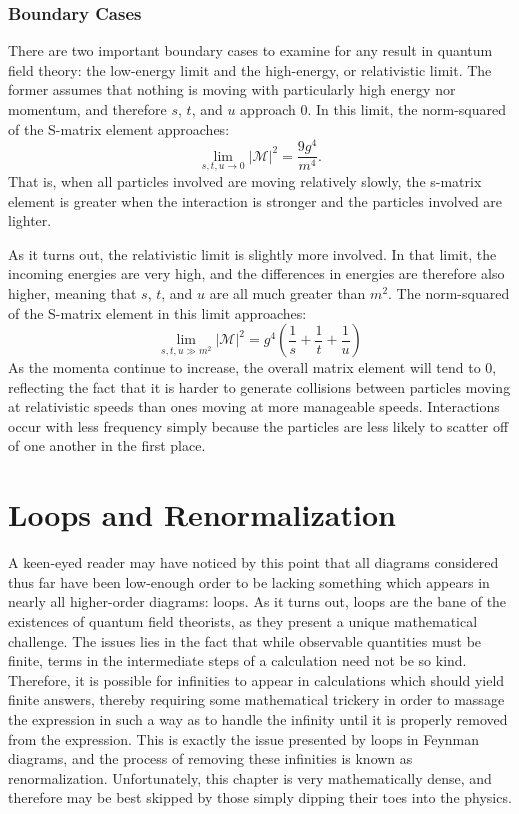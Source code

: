\documentclass{report}
\begin{document}
\subsection{Boundary Cases}
There are two important boundary cases to examine for any result in quantum field theory: the low-energy limit and the high-energy, or relativistic limit. The former assumes that nothing is moving with particularly high energy nor momentum, and therefore $s$, $t$, and $u$ approach 0. In this limit, the norm-squared of the S-matrix element approaches:
\[
\lim_{s,t,u \rightarrow 0} \vert \mathcal{M} \vert ^2 = \frac{9g^4}{m^4}.
\]
That is, when all particles involved are moving relatively slowly, the s-matrix element is greater when the interaction is stronger and the particles involved are lighter.

As it turns out, the relativistic limit is slightly more involved. In that limit, the incoming energies are very high, and the differences in energies are therefore also higher, meaning that $s$, $t$, and $u$ are all much greater than $m^2$. The norm-squared of the S-matrix element in this limit approaches:
\[
\lim_{s,t,u \gg m^2} \vert \mathcal{M} \vert ^2 =
g^4 (\frac{1}{s} + \frac{1}{t} + \frac{1}{u})
\]
As the momenta continue to increase, the overall matrix element will tend to 0, reflecting the fact that it is harder to generate collisions between particles moving at relativistic speeds than ones moving at more manageable speeds. Interactions occur with less frequency simply because the particles are less likely to scatter off of one another in the first place.

\chapter{Loops and Renormalization}
A keen-eyed reader may have noticed by this point that all diagrams considered thus far have been low-enough order to be lacking something which appears in nearly all higher-order diagrams: loops. As it turns out, loops are the bane of the existences of quantum field theorists, as they present a unique mathematical challenge. The issues lies in the fact that while observable quantities must be finite, terms in the intermediate steps of a calculation need not be so kind. Therefore, it is possible for infinities to appear in calculations which should yield finite answers, thereby requiring some mathematical trickery in order to massage the expression in such a way as to handle the infinity until it is properly removed from the expression. This is exactly the issue presented by loops in Feynman diagrams, and the process of removing these infinities is known as renormalization. Unfortunately, this chapter is very mathematically dense, and therefore may be best skipped by those simply dipping their toes into the physics.
\end{document}
